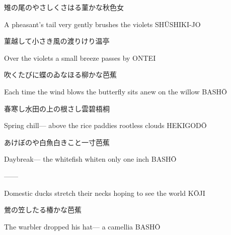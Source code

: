 \begin{haiku}
    {\FH 雉の尾のやさしくさはる菫かな}\hfill{\FH 秋色女}

    \vin{} A pheasant's tail
    \vin{} \vin{} very gently brushes
    \vin{} \vin{} \vin{} the violets \hspace{\fill} SH\={U}SHIKI-JO
\end{haiku}

\begin{haiku}
    {\FH 菫越して小さき風の渡りけり}\hfill{\FH 温亭}

    \vin{} Over the violets
    \vin{} \vin{} a small breeze
    \vin{} \vin{} \vin{} passes by \hspace{\fill} ONTEI
\end{haiku}

\begin{haiku}
    {\FH 吹くたびに蝶のゐなほる柳かな}\hfill{\FH 芭蕉}

    \vin{} Each time the wind blows
    \vin{} \vin{} the butterfly sits anew
    \vin{} \vin{} \vin{} on the willow \hspace{\fill} BASH\={O}
\end{haiku}

\begin{haiku}
    {\FH 春寒し水田の上の根さし雲}\hfill{\FH 碧梧桐}

    \vin{} Spring chill---
    \vin{} \vin{} above the rice paddies
    \vin{} \vin{} \vin{} rootless clouds \hspace{\fill} HEKIGOD\={O}
\end{haiku}

\begin{haiku}
    {\FH あけぼのや白魚白きこと一寸}\hfill{\FH 芭蕉}

    \vin{} Daybreak---
    \vin{} \vin{} the whitefish whiten
    \vin{} \vin{} \vin{} only one inch \hspace{\fill} BASH\={O}
\end{haiku}

\begin{haiku}
    {---}\hfill{---}

    \vin{} Domestic ducks
    \vin{} \vin{} stretch their necks
    \vin{} \vin{} \vin{} hoping to see the world \hspace{\fill} K\={O}JI
\end{haiku}

\begin{haiku}
    {\FH 鶯の笠したる椿かな}\hfill{\FH 芭蕉}

    \vin{} The warbler
    \vin{} \vin{} dropped his hat---
    \vin{} \vin{} \vin{} a camellia \hspace{\fill} BASH\={O}
\end{haiku}

